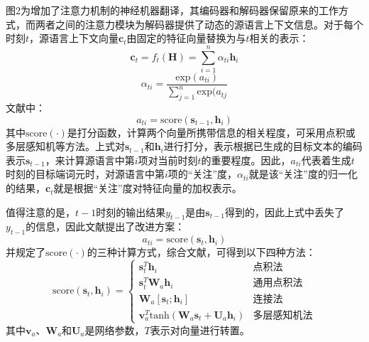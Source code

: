 图2为增加了注意力机制的神经机器翻译，其编码器和解码器保留原来的工作方式，而两者之间的注意力模块为解码器提供了动态的源语言上下文信息。对于每个时刻$t$，源语言上下文向量$\boldsymbol{c}_t$由固定的特征向量替换为与$t$相关的表示：
\begin{equation}
    \boldsymbol{c}_t = f_t(\boldsymbol{H})=\sum_{i=1}^{n}{\alpha}_{ti}\boldsymbol{h}_i
\end{equation}
\begin{equation}
    {\alpha}_{ti}=\frac{\mathrm{exp}(a_{ti})}{\sum_{j=1}^{n}\mathrm{exp}(a_{tj}}
\end{equation}
文献\cite{3_DBLP:journals/corr/BahdanauCB14}中：
\begin{equation}
    a_{ti} = \mathrm{score}(\boldsymbol{s}_{t-1},\boldsymbol{h}_i)
\end{equation}
其中$\mathrm{score}(\cdot)$是打分函数，计算两个向量所携带信息的相关程度，可采用点积或多层感知机等方法。上式对$\boldsymbol{s}_{t-1}$和$\boldsymbol{h}_i$进行打分，表示根据已生成的目标文本的编码表示$\boldsymbol{s}_{t-1}$，来计算源语言中第$i$项对当前时刻$t$的重要程度。因此，$a_{ti}$代表着生成$t$时刻的目标端词元时，对源语言中第$i$项的“关注”度，${\alpha}_{ti}$就是该“关注”度的归一化的结果，$\boldsymbol{c}_t$就是根据“关注”度对特征向量的加权表示。

值得注意的是，$t-1$时刻的输出结果$y_{t-1}$是由$\boldsymbol{s}_{t-1}$得到的，因此上式中丢失了$y_{t-1}$的信息，因此文献\cite{4_luong-etal-2015-effective}提出了改进方案：
\begin{equation}
    a_{ti} = \mathrm{score}(\boldsymbol{s}_{t},\boldsymbol{h}_i)
\end{equation}
并规定了$\mathrm{score}(\cdot)$的三种计算方式，综合文献\cite{3_DBLP:journals/corr/BahdanauCB14}，可得到以下四种方法：
\begin{equation}
    \mathrm{score}(\boldsymbol{s}_t, \boldsymbol{h}_i) = 
    \begin{cases}
        \boldsymbol{s}_t^T \boldsymbol{h}_i & \mbox{点积法} \\
        \boldsymbol{s}_t^T \boldsymbol{W}_a \boldsymbol{h}_i & \mbox{通用点积法} \\
        \boldsymbol{W}_a[\boldsymbol{s}_t; \boldsymbol{h}_i] & \mbox{连接法} \\
        \boldsymbol{v}_a^T \mathrm{tanh}(\boldsymbol{W}_a \boldsymbol{s}_t+\boldsymbol{U}_a \boldsymbol{h}_i) & \mbox{多层感知机法} 
    \end{cases}
\end{equation}
其中$\boldsymbol{v}_a$、$\boldsymbol{W}_a$和$\boldsymbol{U}_a$是网络参数，$T$表示对向量进行转置。

